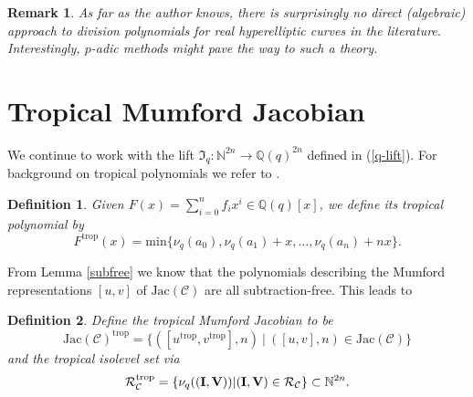 \documentclass[11pt, a4paper]{amsart}
\newcommand{\jac}{\mathrm{Jac(\mathcal C)}}
\newcommand{\eqst}[1]{\begin{equation*}#1\end{equation*}}
\theoremstyle{plain}
\newtheorem{remark}{Remark}[section]
\newtheorem{definition}{Definition}[section]
\numberwithin{equation}{section}
\begin{document}
\begin{remark}
As far as the author knows, there is surprisingly no direct (algebraic) approach to division polynomials for real hyperelliptic curves in the literature. Interestingly, $p$-adic methods might pave the way to such a theory.
\end{remark}

\section{Tropical Mumford Jacobian}
\label{tropicalmumford}
\noindent We continue to work with the lift $\mathfrak I _q : \mathbb N^{2n} \longrightarrow \mathbb Q(q)^{2n}$ defined in (\ref{q-lift}). For background on tropical polynomials we refer to \cite{nobe}.
\begin{definition}
Given $F(x) = \sum_{i=0}^n f_i x^i \in \mathbb Q(q)[x]$, we define its tropical polynomial by \eqst{F^{\mathrm{trop}}(x) = \mathrm{min}\{\nu_q(a_0),\nu_q(a_1)+x,\dots,\nu_q(a_n) + nx\}.}
\end{definition}
\noindent From Lemma \ref{subfree} we know that the polynomials describing the Mumford representations $[u,v]$ of $\jac$ are all subtraction-free. This leads to
\begin{definition}
Define the tropical Mumford Jacobian to be \eqst{\jac^{\mathrm{trop}} = \{([u^{\mathrm{trop}},v^{\mathrm{trop}}],n) \ \vert \ ([u,v],n)\in \jac\}} and the tropical isolevel set via \eqst{\mathcal R_\mathcal C^{\mathrm{trop}} = \{ \nu_q((\bold{I},\bold{V})) \vert (\bold{I},\bold{V}) \in \mathcal R _{\mathcal C} \} \subset \mathbb N^{2n}.} 
\end{definition}
\end{document}
